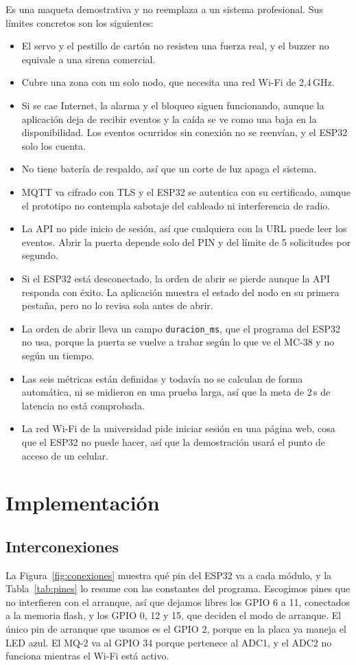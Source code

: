 \documentclass[manuscript,screen,nonacm]{acmart}
\begin{document}
Es una maqueta demostrativa y no reemplaza a un sistema profesional. Sus límites concretos son los siguientes:
\begin{itemize}
  \item El servo y el pestillo de cartón no resisten una fuerza real, y el buzzer no equivale a una sirena comercial.
  \item Cubre una zona con un solo nodo, que necesita una red Wi-Fi de 2,4\,GHz.
  \item Si se cae Internet, la alarma y el bloqueo siguen funcionando, aunque la aplicación deja de recibir eventos y la caída se ve como una baja en la disponibilidad. Los eventos ocurridos sin conexión no se reenvían, y el ESP32 solo los cuenta.
  \item No tiene batería de respaldo, así que un corte de luz apaga el sistema.
  \item MQTT va cifrado con TLS y el ESP32 se autentica con su certificado, aunque el prototipo no contempla sabotaje del cableado ni interferencia de radio.
  \item La API no pide inicio de sesión, así que cualquiera con la URL puede leer los eventos. Abrir la puerta depende solo del PIN y del límite de 5 solicitudes por segundo.
  \item Si el ESP32 está desconectado, la orden de abrir se pierde aunque la API responda con éxito. La aplicación muestra el estado del nodo en su primera pestaña, pero no lo revisa sola antes de abrir.
  \item La orden de abrir lleva un campo \texttt{duracion\_ms}, que el programa del ESP32 no usa, porque la puerta se vuelve a trabar según lo que ve el MC-38 y no según un tiempo.
  \item Las seis métricas están definidas y todavía no se calculan de forma automática, ni se midieron en una prueba larga, así que la meta de 2\,s de latencia no está comprobada.
  \item La red Wi-Fi de la universidad pide iniciar sesión en una página web, cosa que el ESP32 no puede hacer, así que la demostración usará el punto de acceso de un celular.
\end{itemize}

\section{Implementación}
\label{sec:implementacion}

\subsection{Interconexiones}
La Figura~\ref{fig:conexiones} muestra qué pin del ESP32 va a cada módulo, y la Tabla~\ref{tab:pines} lo resume con las constantes del programa. Escogimos pines que no interfieren con el arranque, así que dejamos libres los GPIO 6 a 11, conectados a la memoria flash, y los GPIO 0, 12 y 15, que deciden el modo de arranque. El único pin de arranque que usamos es el GPIO 2, porque en la placa ya maneja el LED azul. El MQ-2 va al GPIO 34 porque pertenece al ADC1, y el ADC2 no funciona mientras el Wi-Fi está activo.
\end{document}
